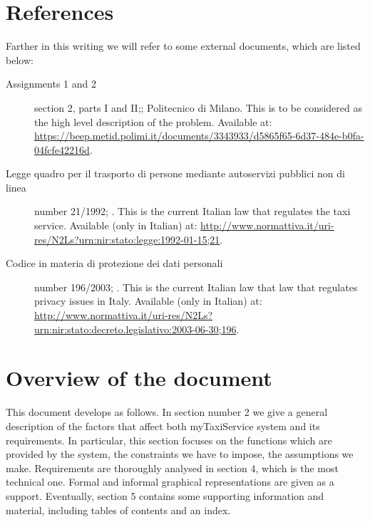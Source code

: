 

\section{References}	

Farther in this writing we will refer to some external documents, which are listed below:
\begin{description}
	\item [Assignments 1 and 2] section 2, parts I and II;; Politecnico di Milano. This is to be considered as the high level description of the problem. Available at: \url{https://beep.metid.polimi.it/documents/3343933/d5865f65-6d37-484e-b0fa-04fcfe42216d}.
	\item [Legge quadro per il trasporto di persone mediante autoservizi pubblici non di linea] number 21/1992; . This is the current Italian law that regulates the taxi service. Available (only in Italian) at: \url{http://www.normattiva.it/uri-res/N2Ls?urn:nir:stato:legge:1992-01-15;21}.
	\item [Codice in materia di protezione dei dati personali] number 196/2003; . This is the current Italian law that law that regulates privacy issues in Italy. Available (only in Italian) at: \url{http://www.normattiva.it/uri-res/N2Ls?urn:nir:stato:decreto.legislativo:2003-06-30;196}.
\end{description}




\section{Overview of the document}	 

This document develops as follows. In section number 2 we give a general description of the factors that affect both myTaxiService system and its requirements. In particular, this section focuses on the functions which are provided by the system, the constraints we have to impose, the assumptions we make. Requirements are thoroughly analysed in section 4, which is the most technical one. Formal and informal graphical representations are given as a support. Eventually, section 5 contains some supporting information and material, including tables of contents and an index.



